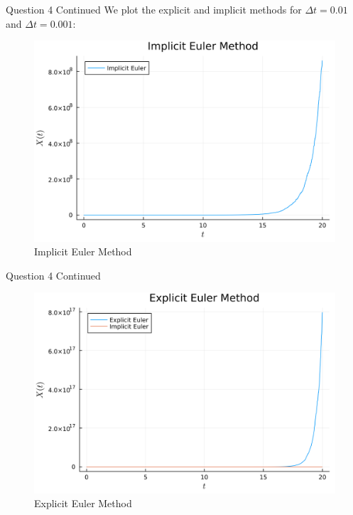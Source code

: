 \documentclass[compress,12pt]{beamer}
\begin{document}
\begin{frame}{Question 4 Continued}
      We plot the explicit and implicit methods for $\Delta t = 0.01$ and $\Delta t = 0.001$:
      \begin{figure}[H]
            \centering
            \includegraphics[scale=0.04]{imgs/4implicit_euler.png}
            \caption{Implicit Euler Method}
            \label{fig:4a}
      \end{figure}
\end{frame}

\begin{frame}{Question 4 Continued}
      \begin{figure}[H]
            \centering
            \includegraphics[scale=0.04]{imgs/4explicit_euler.png}
            \caption{Explicit Euler Method}
            \label{fig:4b}
      \end{figure}
\end{frame}
\end{document}
